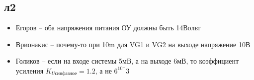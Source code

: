 \subsection{л2}
\begin{itemize}
\item Егоров -- оба напряжения питания ОУ должны быть 14Вольт
\item Врионакис -- почему-то при 10m для VG1 и VG2 на выходе напряжение 10В
\item Голиков -- если на входе системы 5мВ, а на выходе 6мВ, то коэффициент усиления $K_{U\text{синфазное}} = 1.2$, а не $6^10^-3$ 
\end{itemize}

